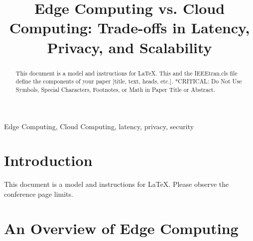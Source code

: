 \documentclass[conference]{IEEEtran}
\begin{document}
\title{Edge Computing vs. Cloud Computing: Trade-offs in Latency, Privacy, and Scalability 
}

\author{
\and

\and

\and

\and

}

\maketitle

\begin{abstract}
This document is a model and instructions for \LaTeX.
This and the IEEEtran.cls file define the components of your paper [title, text, heads, etc.]. *CRITICAL: Do Not Use Symbols, Special Characters, Footnotes, 
or Math in Paper Title or Abstract.
\end{abstract}

\begin{IEEEkeywords}
Edge Computing, Cloud Computing, latency, privacy, security
\end{IEEEkeywords}

\section{Introduction}
This document is a model and instructions for \LaTeX.
Please observe the conference page limits. 

\section{An Overview of Edge Computing}
\end{document}
